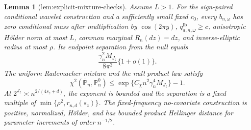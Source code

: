 \documentclass{article}
\newtheorem{lemma}{Lemma}
\begin{document}
\begin{lemma}[lem:explicit-mixture-checks]\label{lem:explicit-mixture-checks}
Assume \(L>1\). For the sign-paired conditional wavelet construction and a sufficiently small fixed \(c_0\), every \(b_{n,\omega}\) has zero conditional mass after multiplication by \(\cos(2\pi y)\), \(q_{a,n,\omega}^{\mathrm{lb}}\ge c\), anisotropic H\"older norm at most \(L\), common marginal \(R_n(dz)=dz\), and inverse-elliptic radius at most \(\rho\). Its endpoint separation from the null equals
\[
\frac{\gamma_n^2M_{J_z}}{8\pi^2}\{1+o(1)\}.
\]
The uniform Rademacher mixture and the null product law satisfy
\[
\chi^2(\overline{\mathbb P}_n,\mathbb P_n^0)\le\exp\{C_{\chi}n^2\gamma_n^4M_{J_z}\}-1.
\]
At \(2^{J_z}\asymp n^{2/(4s_z+d)}\), the exponent is bounded and the separation is a fixed multiple of \(\min\{\rho^2,r_{n,d}(s_z)\}\). The fixed-frequency no-covariate construction is positive, normalized, H\"older, and has bounded product Hellinger distance for parameter increments of order \(n^{-1/2}\).
\end{lemma}
\end{document}

